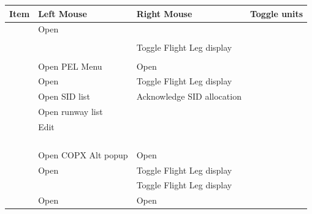 \documentclass[a4paper,oneside,11pt]{memoir}
\begin{document}
\begin{longtable}{|p{}|p{}|p{}|}        \hline
  \textbf{Item}         & \textbf{Left Mouse}       & \textbf{Right Mouse}        \endhead \hline
          & Toggle units              &                             \\ \hline
   & Open      &                             \\ \hline
       &                           &                             \\ \hline
      &                           & Toggle Flight Leg display   \\ \hline
        &                           &                             \\ \hline
        & Open PEL Menu             & Open        \\ \hline
       & Open     & Toggle Flight Leg display   \\ \hline
        & Open SID list             & Acknowledge SID allocation  \\ \hline
       & Open runway list          &                             \\ \hline
      & Edit    &                             \\ \hline
       &                           &                             \\ \hline
       &                           &                             \\ \hline
        &                           &                             \\ \hline
          &                           &                             \\ \hline
        & Open COPX Alt popup       & Open        \\ \hline
       & Open     & Toggle Flight Leg display   \\ \hline
      &                           & Toggle Flight Leg display   \\ \hline
        & Open     & Open      \\ \hline

\end{longtable}
\end{document}
